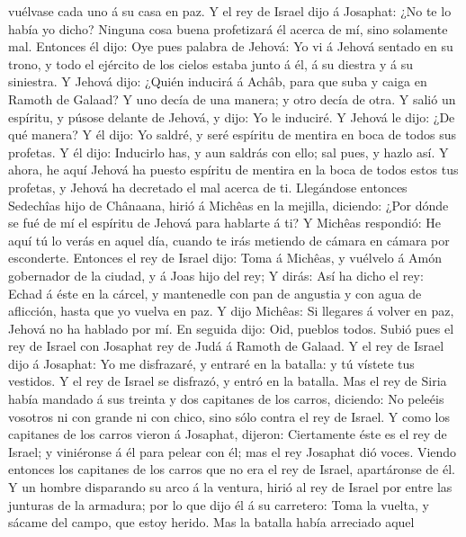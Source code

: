 vuélvase cada uno á su casa en paz.  Y el rey de Israel
dijo á Josaphat: ¿No te lo había yo dicho? Ninguna cosa buena
profetizará él acerca de mí, sino solamente mal.  Entonces
él dijo: Oye pues palabra de Jehová: Yo vi á Jehová sentado en su trono,
y todo el ejército de los cielos estaba junto á él, á su diestra y á su
siniestra.  Y Jehová dijo: ¿Quién inducirá á Achâb, para
que suba y caiga en Ramoth de Galaad? Y uno decía de una manera; y otro
decía de otra.  Y salió un espíritu, y púsose delante de
Jehová, y dijo: Yo le induciré. Y Jehová le dijo: ¿De qué manera?
 Y él dijo: Yo saldré, y seré espíritu de mentira en boca
de todos sus profetas. Y él dijo: Inducirlo has, y aun saldrás con ello;
sal pues, y hazlo así.  Y ahora, he aquí Jehová ha puesto
espíritu de mentira en la boca de todos estos tus profetas, y Jehová ha
decretado el mal acerca de ti.  Llegándose entonces
Sedechîas hijo de Chânaana, hirió á Michêas en la mejilla, diciendo:
¿Por dónde se fué de mí el espíritu de Jehová para hablarte á ti?
 Y Michêas respondió: He aquí tú lo verás en aquel día,
cuando te irás metiendo de cámara en cámara por esconderte.
 Entonces el rey de Israel dijo: Toma á Michêas, y vuélvelo
á Amón gobernador de la ciudad, y á Joas hijo del rey;  Y
dirás: Así ha dicho el rey: Echad á éste en la cárcel, y mantenedle con
pan de angustia y con agua de aflicción, hasta que yo vuelva en paz.
 Y dijo Michêas: Si llegares á volver en paz, Jehová no ha
hablado por mí. En seguida dijo: Oid, pueblos todos.  Subió
pues el rey de Israel con Josaphat rey de Judá á Ramoth de Galaad.
 Y el rey de Israel dijo á Josaphat: Yo me disfrazaré, y
entraré en la batalla: y tú vístete tus vestidos. Y el rey de Israel se
disfrazó, y entró en la batalla.  Mas el rey de Siria había
mandado á sus treinta y dos capitanes de los carros, diciendo: No
peleéis vosotros ni con grande ni con chico, sino sólo contra el rey de
Israel.  Y como los capitanes de los carros vieron á
Josaphat, dijeron: Ciertamente éste es el rey de Israel; y viniéronse á
él para pelear con él; mas el rey Josaphat dió voces. 
Viendo entonces los capitanes de los carros que no era el rey de Israel,
apartáronse de él.  Y un hombre disparando su arco á la
ventura, hirió al rey de Israel por entre las junturas de la armadura;
por lo que dijo él á su carretero: Toma la vuelta, y sácame del campo,
que estoy herido.  Mas la batalla había arreciado aquel
